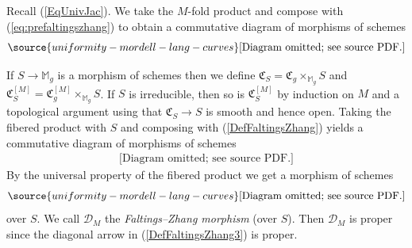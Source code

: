 Recall (\ref{EqUnivJac}). We take the $M$-fold product and compose
with (\ref{eq:prefaltingszhang}) to obtain a commutative diagram of
morphisms of schemes %
\begin{equation}
  \label{DefFaltingsZhang}
\source{uniformity-mordell-lang-curves}
  \begin{aligned}
    \text{[Diagram omitted; see source PDF.]}
  \end{aligned}
\end{equation}

If $S\rightarrow \mathbb{M}_g$ is a morphism of schemes then we define
$\mathfrak{C}_S = \mathfrak{C}_g \times_{\mathbb{M}_g} S$ and
$\mathfrak{C}_S^{[M]} = \mathfrak{C}_g^{[M]}\times_{\mathbb{M}_g} S$.
If $S$ is irreducible, then so is $\mathfrak{C}_S^{[M]}$ by induction
on $M$ and a topological argument using that
$\mathfrak{C}_S\rightarrow S$ is smooth and hence open.
Taking the fibered product with $S$  and composing with (\ref{DefFaltingsZhang})
yields a commutative diagram of morphisms of schemes
\begin{equation*}
  \begin{aligned}
    \text{[Diagram omitted; see source PDF.]}
  \end{aligned}
\end{equation*}
By the
universal property
of the fibered product we get a morphism of schemes
\begin{equation}
  \label{DefFaltingsZhang3}
\source{uniformity-mordell-lang-curves}
  \begin{aligned}
    \text{[Diagram omitted; see source PDF.]}
  \end{aligned}
\end{equation}
over $S$. We call $\mathscr{D}_{M}$ the \textit{Faltings--Zhang morphism} (over
$S$).
Then $\mathscr{D}_{M}$  is proper since the diagonal arrow in
(\ref{DefFaltingsZhang3}) is proper.

